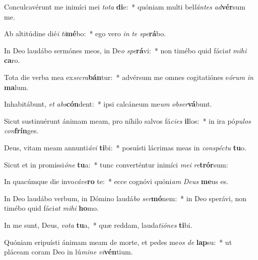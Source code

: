 \item Conculcavérunt me inimíci mei \textit{to}\textit{ta} \textbf{di}e:~* quóniam multi bel\textit{lán}\textit{tes} \textit{ad}\textbf{vér}sum me.
\item Ab altitúdine dié\textit{i} \textit{ti}\textbf{mé}bo:~* ego vero \textit{in} \textit{te} \textit{spe}\textbf{rá}bo.
\item In Deo laudábo sermónes meos, in De\textit{o} \textit{spe}\textbf{rá}vi:~* non timébo quid fáci\textit{at} \textit{mi}\textit{hi} \textbf{ca}ro.
\item Tota die verba mea ex\textit{se}\textit{cra}\textbf{bán}tur:~* advérsum me omnes cogitatiónes e\textit{ó}\textit{rum} \textit{in} \textbf{ma}lum.
\item Inhabitábunt, \textit{et} \textit{abs}\textbf{cón}dent:~* ipsi calcáneum me\textit{um} \textit{ob}\textit{ser}\textbf{vá}bunt.
\item Sicut sustinuérunt ánimam meam, pro níhilo salvos fá\textit{ci}\textit{es} \textbf{il}los:~* in ira pó\textit{pu}\textit{los} \textit{con}\textbf{frín}ges.
\item Deus, vitam meam annunti\textit{á}\textit{vi} \textbf{ti}bi:~* posuísti lácrimas meas in \textit{con}\textit{spéc}\textit{tu} \textbf{tu}o.
\item Sicut et in promissi\textit{ó}\textit{ne} \textbf{tu}a:~* tunc converténtur inimíci \textit{me}\textit{i} \textit{re}\textbf{trór}sum:
\item In quacúmque die invo\textit{cá}\textit{ve}\textbf{ro} te:~* ecce cognóvi quóni\textit{am} \textit{De}\textit{us} \textbf{me}us es.
\item In Deo laudábo verbum, in Dómino laudá\textit{bo} \textit{ser}\textbf{mó}nem:~* in Deo sperávi, non timébo quid fáci\textit{at} \textit{mi}\textit{hi} \textbf{ho}mo.
\item In me sunt, Deus, \textit{vo}\textit{ta} \textbf{tu}a,~* quæ reddam, lauda\textit{ti}\textit{ó}\textit{nes} \textbf{ti}bi.
\item Quóniam eripuísti ánimam meam de morte, et pedes me\textit{os} \textit{de} \textbf{lap}su:~* ut pláceam coram Deo in lú\textit{mi}\textit{ne} \textit{vi}\textbf{vén}tium.
